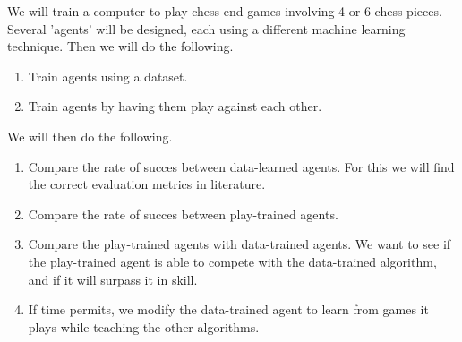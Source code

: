 We will train a computer to play chess end-games involving 4 or 6 chess pieces. 
 Several 'agents' will be
designed, each using a different machine learning technique. Then we will do the
following.
\begin{enumerate}
    \item Train agents using a dataset.
    \item Train agents by having them play against each other.
\end{enumerate}
We will then do the following.
\begin{enumerate}
\item Compare the rate of succes between data-learned agents. For this we will
find the correct evaluation metrics in literature.
\item Compare the rate of succes between play-trained agents. 
\item Compare the play-trained agents with data-trained agents.
We want to see if the play-trained agent is able to compete with the
data-trained
algorithm, and if it will surpass it in skill.
\item If time permits, we modify the data-trained agent to learn from 
games it plays while teaching the other algorithms.
\end{enumerate}
